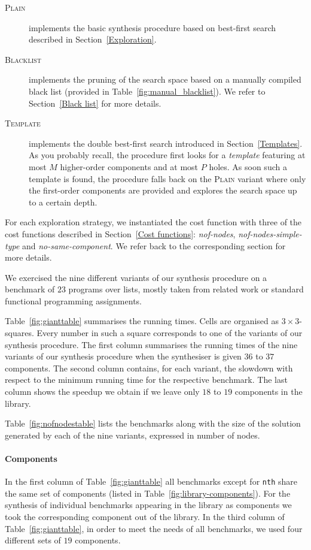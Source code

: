 \begin{description}
\item[\mdseries\textsc{Plain}] implements the basic synthesis procedure based on best-first search described in Section~\ref{Exploration}.
\item[\mdseries\textsc{Blacklist}] implements the pruning of the search space based on a manually compiled black list (provided in Table~\ref{fig:manual_blacklist}). We refer to Section~\ref{Black list} for more details.
\item[\mdseries\textsc{Template}] implements the double best-first search introduced in Section~\ref{Templates}. As you probably recall, the procedure first looks for a \emph{template} featuring at most $M$ higher-order components and at most $P$ holes. As soon such a template is found, the procedure falls back on the \textsc{Plain} variant where only the first-order components are provided and explores the search space up to a certain depth.
\end{description}

For each exploration strategy, we instantiated the cost function with three of the cost functions described in Section~\ref{Cost functions}: \textit{nof-nodes}, \textit{nof-nodes-simple-type} and \textit{no-same-component}. We refer back to the corresponding section for more details.

We exercised the nine different variants of our synthesis procedure on a benchmark of $23$ programs over lists, mostly taken from related work or standard functional programming assignments.

Table~\ref{fig:gianttable} summarises the running times. Cells are organised as $3 \times 3$-squares. Every number in such a square corresponds to one of the variants of our synthesis procedure.
The first column summarises the running times of the nine variants of our synthesis procedure when the synthesiser is given $36$ to $37$ components.
The second column contains, for each variant, the slowdown with respect to the minimum running time for the respective benchmark.
The last column shows the speedup we obtain if we leave only $18$ to $19$ components in the library.

Table~\ref{fig:nofnodestable} lists the benchmarks along with the size of the solution generated by each of the nine variants, expressed in number of nodes.

\paragraph{Components} In the first column of Table~\ref{fig:gianttable} all benchmarks except for \lstinline?nth? share the same set of components (listed in Table~\ref{fig:library-components}). For the synthesis of individual benchmarks appearing in the library as components we took the corresponding component out of the library.
In the third column of Table~\ref{fig:gianttable}, in order to meet the needs of all benchmarks, we used four different sets of $19$ components.

